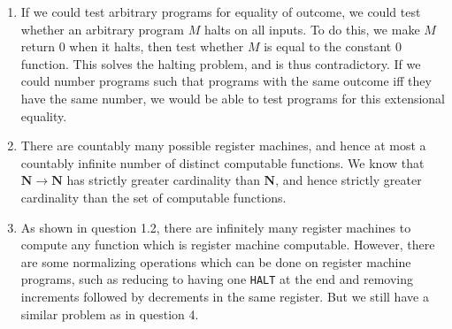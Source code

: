 \documentclass{article}
\begin{document}
\begin{enumerate}
  \item If we could test arbitrary programs for equality of outcome, we could test whether an arbitrary program $M$ halts on all inputs. To do this, we make $M$ return $0$ when it halts, then test whether $M$ is equal to the constant $0$ function. This solves the halting problem, and is thus contradictory. If we could number programs such that programs with the same outcome iff they have the same number, we would be able to test programs for this extensional equality.
  \item There are countably many possible register machines, and hence at most a countably infinite number of distinct computable functions. We know that $\mathbf N \to \mathbf N$ has strictly greater cardinality than $\mathbf N$, and hence strictly greater cardinality than the set of computable functions.
  \item As shown in question 1.2, there are infinitely many register machines to compute any function which is register machine computable. However, there are some normalizing operations which can be done on register machine programs, such as reducing to having one \texttt{HALT} at the end and removing increments followed by decrements in the same register. But we still have a similar problem as in question 4.
\end{enumerate}
\end{document}
